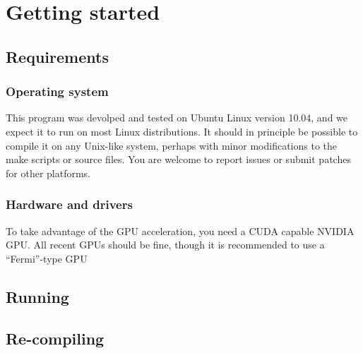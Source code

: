 \section{Getting started}

\subsection{Requirements}

\subsubsection{Operating system}

This program was devolped and tested on Ubuntu Linux version 10.04, and we expect it to run on most Linux distributions. It should in principle be possible to compile it on any Unix-like system, perhaps with minor modifications to the make scripts or source files. You are welcome to report issues or submit patches for other platforms.

\subsubsection{Hardware and drivers}

To take advantage of the GPU acceleration, you need a CUDA capable \textsc{NVIDIA} GPU. All recent GPUs should be fine, though it is recommended to use a ``Fermi''-type GPU 

\subsection{Running}

\subsection{Re-compiling}




